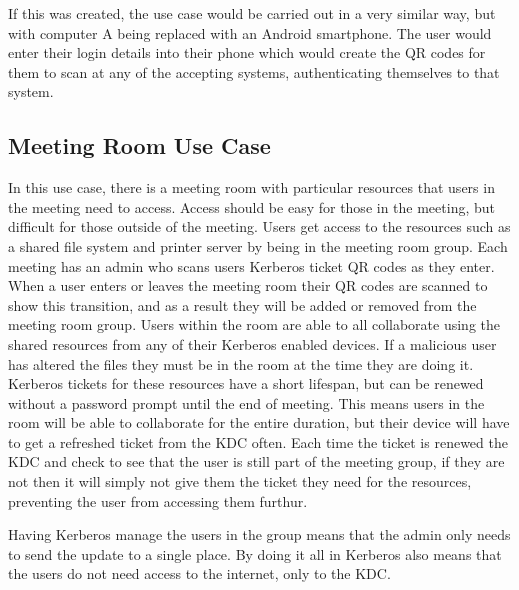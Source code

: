 \documentclass[]{report}   %
\begin{document}
If this was created, the use case would be carried out in a very similar way, but with computer A being replaced with an Android smartphone. The user would enter their login details into their phone which would create the QR codes for them to scan at any of the accepting systems, authenticating themselves to that system.

\subsection{Meeting Room Use Case}
In this use case, there is a meeting room with particular resources that users in the meeting need to access. Access should be easy for those in the meeting, but difficult for those outside of the meeting. Users get access to the resources such as a shared file system and printer server by being in the meeting room group. Each meeting has an admin who scans users Kerberos ticket QR codes as they enter. When a user enters or leaves the meeting room their QR codes are scanned to show this transition, and as a result they will be added or removed from the meeting room group. Users within the room are able to all collaborate using the shared resources from any of their Kerberos enabled devices. If a malicious user has altered the files they must be in the room at the time they are doing it. Kerberos tickets for these resources have a short lifespan, but can be renewed without a password prompt until the end of meeting. This means users in the room will be able to collaborate for the entire duration, but their device will have to get a refreshed ticket from the KDC often. Each time the ticket is renewed the KDC and check to see that the user is still part of the meeting group, if they are not then it will simply not give them the ticket they need for the resources, preventing the user from accessing them furthur.

Having Kerberos manage the users in the group means that the admin only needs to send the update to a single place. By doing it all in Kerberos also means that the users do not need access to the internet, only to the KDC.
\end{document}
